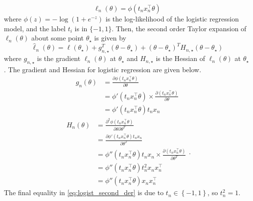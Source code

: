 \begin{equation}\label{eq:logist_log_likelihood}
\ell_n(\theta) = \phi\left(t_n x_n^{\top}\theta \right)
\end{equation}
where $\phi(z) = -\log\left( 1  + e^{-z}\right)$ is the log-likelihood of the logistic regression model, and the label $t_i$ is in $\{-1, 1\}$. Then, the second order Taylor expansion of $\ell_n\left(\theta\right)$ about some point $\theta_{\star}$ is given by
\begin{equation}\label{eq:Taylor_exp}
    \hat{\ell}_n\left(\theta\right) = \ell\left(\theta_{\star}\right) + g^T_{n, \star}\left(\theta - \theta_{\star}\right) + \left(\theta - \theta_{\star}\right)^TH_{n, \star}\left(\theta - \theta_{\star}\right)  
\end{equation}
where $g_{n, \star}$ is the gradient $\ell_n\left(\theta\right)$ at $\theta_{\star}$ and $H_{n, \star}$ is the Hessian of $\ell_n\left(\theta\right)$ at $\theta_{\star}$. The gradient and Hessian for logistic regression are given below. 
\begin{equation}
\begin{split}
    g_n\left(\theta\right) &= \frac{\partial\phi\left(t_nx_n^{\top}\theta \right)}{\partial\theta}\\ 
    &= \phi'\left(t_n x_n^{\top}\theta \right)\times \frac{\partial\left(t_n x_n^{\top} \theta \right)}{\partial\theta}  \\
    & = \phi'\left(t_n x_n^{\top}\theta \right) t_n x_n
\end{split}
\end{equation}
\begin{equation}\label{eq:logist_second_der}
    \begin{split}
    H_n\left(\theta\right) &= \frac{\partial^2\phi\left(t_n x_n^{\top}\theta  \right)}{\partial\theta\partial\theta^T} \\
    &= \frac{\partial \phi'\left(t_n x_n^{\top}\theta \right) t_n x_n}{\partial \theta^T} \\
    & = \phi''\left(t_n x_n^{\top} \theta \right) t_n x_n \times \frac{\partial\left(t_nx_n^{\top}\theta \right)}{\partial \theta^T} \\
    & = \phi''\left(t_n x_n^{\top}\theta \right) t_n^2 x_n x_n^{\top} \\
    & = \phi''\left(t_n x_n^{\top}\theta \right)x_n x_n^{\top}
\end{split}. 
\end{equation}
The final equality in \eqref{eq:logist_second_der} is due to $t_n \in \left\{-1, 1\right\}$, so $t_n^2 = 1$. 

